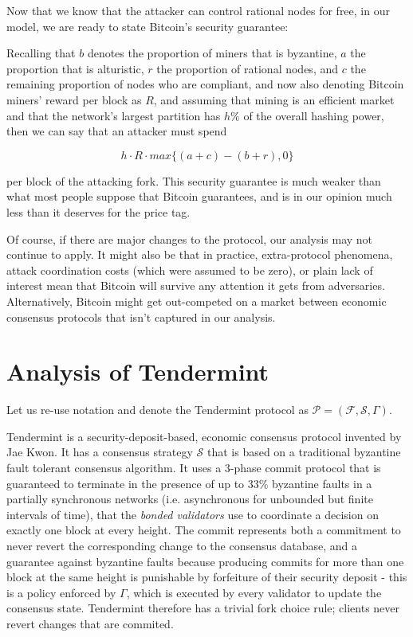 \documentclass[11pt,a4paper]{article}
\theoremstyle{plain}
\theoremstyle{definition}
\begin{document}
Now that we know that the attacker can control rational nodes for free, in our model, we are ready to state Bitcoin's security guarantee:

Recalling that $b$ denotes the proportion of miners that is byzantine, $a$ the proportion that is alturistic, $r$ the proportion of rational nodes, and $c$ the remaining proportion of nodes who are compliant, and now also denoting Bitcoin miners' reward per block as $R$, and assuming that mining is an efficient market and that the network's largest partition has $h\%$ of the overall hashing power, then we can say that an attacker must spend 

$$h \cdot R \cdot max\{(a + c) - (b + r),0\}$$ 

per block of the attacking fork. This security guarantee is much weaker than what most people suppose that Bitcoin guarantees, and is in our opinion much less than it deserves for the price tag. 

Of course, if there are major changes to the protocol, our analysis may not continue to apply. It might also be that in practice, extra-protocol phenomena, attack coordination costs (which were assumed to be zero), or plain lack of interest mean that Bitcoin will survive any attention it gets from adversaries. Alternatively, Bitcoin might get out-competed on a market between economic consensus protocols that isn't captured in our analysis.

\section{Analysis of Tendermint}

Let us re-use notation and denote the Tendermint protocol as $\mathcal{P} = (\mathcal{F}, \mathcal{S}, \Gamma)$. 

Tendermint is a security-deposit-based, economic consensus protocol invented by Jae Kwon\cite{Tendermint}. It has a consensus strategy $\mathcal{S}$ that is based on a traditional byzantine fault tolerant consensus algorithm. It uses a 3-phase commit protocol that is guaranteed to terminate in the presence of up to 33\% byzantine faults in a partially synchronous networks (i.e. asynchronous for unbounded but finite intervals of time), that the \emph{bonded validators} use to coordinate a decision on exactly one block at every height. The commit represents both a commitment to never revert the corresponding change to the consensus database, and a guarantee against byzantine faults because producing commits for more than one block at the same height is punishable by forfeiture of their security deposit - this is a policy enforced by $\Gamma$, which is executed by every validator to update the consensus state. Tendermint therefore has a trivial fork choice rule; clients never revert changes that are commited.
\end{document}
